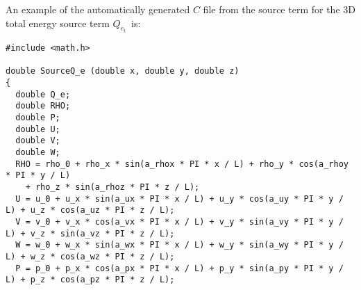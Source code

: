 \documentclass[10pt]{article}
\begin{document}
An example of the automatically generated $C$ file from the source term for the 3D total energy source term $Q_{e_t}$~is:

\begin{small}
\begin{verbatim}
#include <math.h>

double SourceQ_e (double x, double y, double z)
{
  double Q_e;
  double RHO;
  double P;
  double U;
  double V;
  double W;
  RHO = rho_0 + rho_x * sin(a_rhox * PI * x / L) + rho_y * cos(a_rhoy * PI * y / L)
    + rho_z * sin(a_rhoz * PI * z / L);
  U = u_0 + u_x * sin(a_ux * PI * x / L) + u_y * cos(a_uy * PI * y / L) + u_z * cos(a_uz * PI * z / L);
  V = v_0 + v_x * cos(a_vx * PI * x / L) + v_y * sin(a_vy * PI * y / L) + v_z * sin(a_vz * PI * z / L);
  W = w_0 + w_x * sin(a_wx * PI * x / L) + w_y * sin(a_wy * PI * y / L) + w_z * cos(a_wz * PI * z / L);
  P = p_0 + p_x * cos(a_px * PI * x / L) + p_y * sin(a_py * PI * y / L) + p_z * cos(a_pz * PI * z / L);


\end{verbatim}
\end{small}
\end{document}
